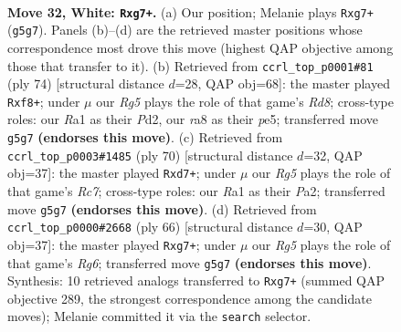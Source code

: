 \documentclass[11pt]{article}
\begin{document}
\clearpage

\begin{figure}[p]\centering
\begin{subfigure}{0.46\textwidth}\centering
\resizebox{\linewidth}{!}{%
\newchessgame
\chessboard[
  setfen={r5k1/6r1/8/6R1/p5p1/P7/6KP/R7 w - - 3 32},
  showmover=false,
  pgfstyle=straightmove, color=movearrow, markmove={g5-g7}
]}
\caption{}
\end{subfigure}\hfill
\begin{subfigure}{0.46\textwidth}\centering
\resizebox{\linewidth}{!}{%
\newchessgame
\chessboard[
  setfen={3R1rk1/7p/7P/4p3/6p1/6P1/3P4/6K1 w - - 3 38},
  showmover=false,
  pgfstyle=straightmove, color=movearrow, markmove={d8-f8}
]}
\caption{}
\end{subfigure}
\\[4pt]
\begin{subfigure}{0.46\textwidth}\centering
\resizebox{\linewidth}{!}{%
\newchessgame
\chessboard[
  setfen={8/2Rrk3/4p3/1p2P3/8/8/PP6/1K6 w - - 3 36},
  showmover=false,
  pgfstyle=straightmove, color=movearrow, markmove={c7-d7}
]}
\caption{}
\end{subfigure}\hfill
\begin{subfigure}{0.46\textwidth}\centering
\resizebox{\linewidth}{!}{%
\newchessgame
\chessboard[
  setfen={6k1/pp1r2r1/6R1/8/8/1P6/1KP5/7R w - - 3 34},
  showmover=false,
  pgfstyle=straightmove, color=movearrow, markmove={g6-g7}
]}
\caption{}
\end{subfigure}
\caption{\textbf{Move 32, White: \texttt{Rxg7+}.} (a) Our position; Melanie plays \texttt{Rxg7+} (\texttt{g5g7}). Panels (b)--(d) are the retrieved master positions whose correspondence most drove this move (highest QAP objective among those that transfer to it). (b) Retrieved from \texttt{ccrl\_top\_p0001\#81} (ply 74) [structural distance $d$=28, QAP obj=68]: the master played \texttt{Rxf8+}; under $\mu$ our \emph{Rg5} plays the role of that game's \emph{Rd8}; cross-type roles: our \emph{R}a1 as their \emph{P}d2, our \emph{r}a8 as their \emph{p}e5; transferred move \texttt{g5g7} \textbf{(endorses this move)}. (c) Retrieved from \texttt{ccrl\_top\_p0003\#1485} (ply 70) [structural distance $d$=32, QAP obj=37]: the master played \texttt{Rxd7+}; under $\mu$ our \emph{Rg5} plays the role of that game's \emph{Rc7}; cross-type roles: our \emph{R}a1 as their \emph{P}a2; transferred move \texttt{g5g7} \textbf{(endorses this move)}. (d) Retrieved from \texttt{ccrl\_top\_p0000\#2668} (ply 66) [structural distance $d$=30, QAP obj=37]: the master played \texttt{Rxg7+}; under $\mu$ our \emph{Rg5} plays the role of that game's \emph{Rg6}; transferred move \texttt{g5g7} \textbf{(endorses this move)}. Synthesis: 10 retrieved analogs transferred to \texttt{Rxg7+} (summed QAP objective 289, the strongest correspondence among the candidate moves); Melanie committed it via the \texttt{search} selector.}
\label{fig:thought-m62}
\end{figure}
\end{document}
